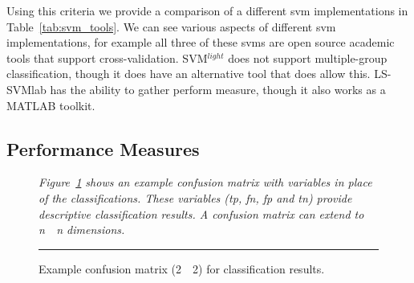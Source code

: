 Using this criteria we provide a comparison of a different \gls{svm} implementations in Table~\ref{tab:svm_tools}. We can see various aspects of different \gls{svm} implementations, for example all three of these \gls{svm}s are open source academic tools that support cross-validation. SVM$^{light}$ does not support multiple-group classification, though it does have an alternative tool that does allow this. LS-SVMlab has the ability to gather perform measure, though it also works as a MATLAB toolkit.


\subsection{Performance Measures}
\label{subsec:background_performance_measures}
\begin{figure}[!t]
  \centering
  \caption{Example confusion matrix (2~\times~2) for classification results.}
  \vspace{1mm}
  \footnotesize{\emph{Figure~\ref{fig:example_confusion_matrix} shows an example confusion matrix with variables in place of the classifications. These variables (\gls{tp}, \gls{fn}, \gls{fp} and \gls{tn}) provide descriptive classification results. A confusion matrix can extend to n~\times~n dimensions.}}
  \vspace{2mm}
  \hrule
  \label{fig:example_confusion_matrix}
\end{figure}

